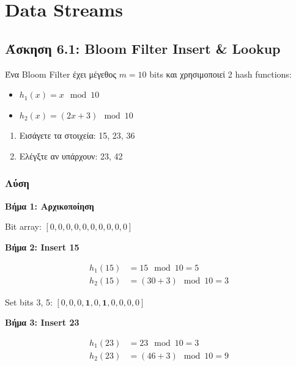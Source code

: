 \section{Data Streams}

\subsection{Άσκηση 6.1: Bloom Filter Insert \& Lookup}

\begin{formulabox}[Εκφώνηση]
Ένα Bloom Filter έχει μέγεθος $m = 10$ bits και χρησιμοποιεί 2 hash functions:
\begin{itemize}
    \item $h_1(x) = x \mod 10$
    \item $h_2(x) = (2x + 3) \mod 10$
\end{itemize}

\begin{enumerate}
    \item Εισάγετε τα στοιχεία: 15, 23, 36
    \item Ελέγξτε αν υπάρχουν: 23, 42
\end{enumerate}
\end{formulabox}

\subsubsection*{Λύση}

\textbf{Βήμα 1: Αρχικοποίηση}

Bit array: $[0, 0, 0, 0, 0, 0, 0, 0, 0, 0]$

\textbf{Βήμα 2: Insert 15}

\begin{align*}
h_1(15) &= 15 \mod 10 = 5 \\
h_2(15) &= (30 + 3) \mod 10 = 3
\end{align*}

Set bits 3, 5: $[0, 0, 0, \mathbf{1}, 0, \mathbf{1}, 0, 0, 0, 0]$

\textbf{Βήμα 3: Insert 23}

\begin{align*}
h_1(23) &= 23 \mod 10 = 3 \\
h_2(23) &= (46 + 3) \mod 10 = 9
\end{align*}

